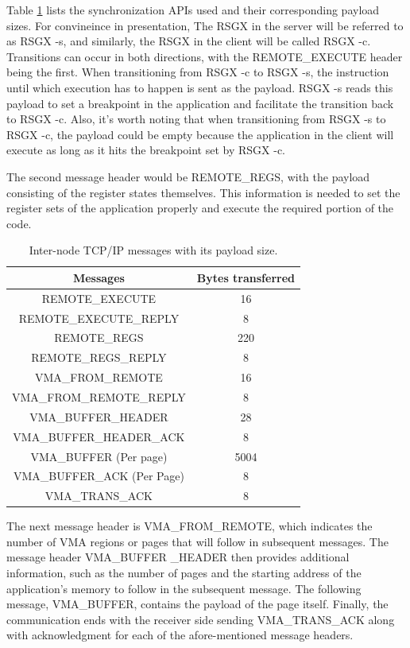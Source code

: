 \documentclass[article, doublespace,nopageskip]{VTthesis} %
\newcommand{\monitor}{RSGX \xspace}
\begin{document}
    Table \ref{t:TPayload} lists the synchronization APIs used and their corresponding payload sizes. For convineince in presentation, The \monitor in the server will be referred to as \monitor-s, and similarly, the \monitor in the client will be called \monitor-c. Transitions can occur in both directions, with the REMOTE\_EXECUTE header being the first.  When transitioning from \monitor-c to \monitor-s, the instruction until which execution has to happen is sent as the payload. \monitor-s reads this payload to set a breakpoint in the application and facilitate the transition back to \monitor-c. Also, it’s worth noting that when transitioning from \monitor-s to \monitor-c, the payload could be empty because the application in the client will execute as long as it hits the breakpoint set by \monitor-c. 
    
    The second message header would be REMOTE\_REGS, with the payload consisting of the register states themselves. This information is needed to set the register sets of the application properly and execute the required portion of the code.
    
    \begin{table}[h]
	\centering
	\footnotesize
	\caption{Inter-node TCP/IP messages with its payload size.}
	\begin{tabular}{| c | c |} \hline
		  Messages & Bytes transferred\\ \hline \hline
        REMOTE\_EXECUTE  &  16 \\ \hline
        REMOTE\_EXECUTE\_REPLY  &  8 \\  \hline
        REMOTE\_REGS &  220 \\  \hline
        REMOTE\_REGS\_REPLY & 8 \\ \hline
        VMA\_FROM\_REMOTE &  16 \\ \hline
        VMA\_FROM\_REMOTE\_REPLY &  8\\ \hline
        VMA\_BUFFER\_HEADER & 28 \\ \hline
        VMA\_BUFFER\_HEADER\_ACK & 8 \\ \hline
        VMA\_BUFFER (Per page) & 5004\\ \hline
        VMA\_BUFFER\_ACK (Per Page) & 8 \\ \hline
        VMA\_TRANS\_ACK & 8\\ \hline
	\end{tabular}
	\label{t:TPayload}
    \end{table}
    
    The next message header is VMA\_FROM\_REMOTE, which indicates the number of VMA regions or pages that will follow in subsequent messages. The message header VMA\_BUFFER \_HEADER then provides additional information, such as the number of pages and the starting address of the application’s memory to follow in the subsequent message. The following message, VMA\_BUFFER, contains the payload of the page itself. Finally, the communication ends with the receiver side sending VMA\_TRANS\_ACK along with acknowledgment for each of the afore-mentioned message headers. 
    
\end{document}
